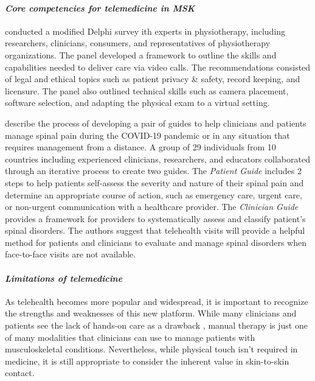 \documentclass[utf8]{FrontiersinHarvard} %
\begin{document}
\paragraph{\textit{Core competencies for telemedicine in MSK}}

\citet{daviesInternationalCoreCapability2021} conducted a modified Delphi survey ith experts in physiotherapy, including researchers, clinicians, consumers, and representatives of physiotherapy organizations. The panel developed a framework to outline the skills and capabilities needed to deliver care via video calls. The recommendations consisted of legal and ethical topics such as patient privacy \& safety, record keeping, and licensure. The panel also outlined technical skills such as camera placement, software selection, and adapting the physical exam to a virtual setting.

\citet{haldemanDistanceManagementSpinal2021} describe the process of developing a pair of guides to help clinicians and patients manage spinal pain during the COVID-19 pandemic or in any situation that requires management from a distance. A group of 29 individuals from 10 countries including experienced clinicians, researchers, and educators collaborated through an iterative process to create two guides. The \textit{Patient Guide} includes 2 steps to help patients self-assess the severity and nature of their spinal pain and determine an appropriate course of action, such as emergency care, urgent care, or non-urgent communication with a healthcare provider. The \textit{Clinician Guide} provides a framework for providers to systematically assess and classify patient's spinal disorders. The authors suggest that telehealth visits will provide a helpful method for patients and clinicians to evaluate and manage spinal disorders when face-to-face visits are not available.

\paragraph{\textit{Limitations of telemedicine}}

As telehealth becomes more popular and widespread, it is important to recognize the strengths and weaknesses of this new platform. While many clinicians and patients see the lack of hands-on care as a drawback \citep{bartonItsSecondBest2022}, manual therapy is just one of many modalities that clinicians can use to manage patients with musculoskeletal conditions. Nevertheless, while physical touch isn't required in medicine, it is still appropriate to consider the inherent value in skin-to-skin contact.
\end{document}
